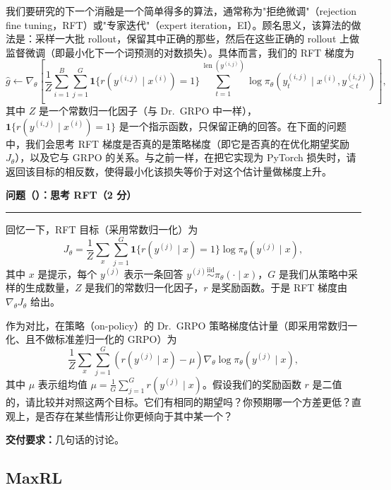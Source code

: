 我们要研究的下一个消融是一个简单得多的算法，通常称为"拒绝微调"（rejection fine tuning，RFT）或"专家迭代"（expert iteration，EI）。顾名思义，该算法的做法是：采样一大批 rollout，保留其中正确的那些，然后在这些正确的 rollout 上做监督微调（即最小化下一个词预测的对数损失）。具体而言，我们的 RFT 梯度为
\begin{equation}
\hat{g} \leftarrow \nabla_\theta\!\left[\frac{1}{Z}\sum_{i=1}^{B}\sum_{j=1}^{G}
\mathbf{1}\{r\!\left(y^{(i,j)} \mid x^{(i)}\right) = 1\}
\sum_{t=1}^{\operatorname{len}\!\left(y^{(i,j)}\right)}
\log \pi_\theta\!\left(y_t^{(i,j)} \mid x^{(i)}, y^{(i,j)}_{<t}\right)\right],
\end{equation}
其中 $Z$ 是一个常数归一化因子（与 Dr.\ GRPO 中一样），$\mathbf{1}\{r(y^{(i,j)} \mid x^{(i)}) = 1\}$ 是一个指示函数，只保留正确的回答。在下面的问题中，我们会思考 RFT 梯度是否真的是策略梯度（即它是否真的在优化期望奖励 $J_\theta$），以及它与 GRPO 的关系。与之前一样，在把它实现为 PyTorch 损失时，请返回该目标的相反数，使得最小化该损失等价于对这个估计量做梯度上升。

\medskip
\noindent\textbf{问题（）：思考 RFT（2 分）}
\par\nobreak\smallskip\hrule\nobreak\medskip

回忆一下，RFT 目标（采用常数归一化）为
\begin{equation}
J_\theta = \frac{1}{Z}\sum_{x}\sum_{j=1}^{G}\mathbf{1}\{r(y^{(j)} \mid x) = 1\}\log \pi_\theta\!\left(y^{(j)} \mid x\right),
\end{equation}
其中 $x$ 是提示，每个 $y^{(j)}$ 表示一条回答 $y^{(j)} \overset{\text{iid}}{\sim} \pi_\theta(\cdot \mid x)$，$G$ 是我们从策略中采样的生成数量，$Z$ 是我们的常数归一化因子，$r$ 是奖励函数。于是 RFT 梯度由 $\nabla_\theta J_\theta$ 给出。

作为对比，在策略（on-policy）的 Dr.\ GRPO 策略梯度估计量（即采用常数归一化、且不做标准差归一化的 GRPO）为
\begin{equation}
\frac{1}{Z}\sum_{x}\sum_{j=1}^{G}\left(r(y^{(j)} \mid x) - \mu\right)\nabla_\theta \log \pi_\theta\!\left(y^{(j)} \mid x\right),
\end{equation}
其中 $\mu$ 表示组均值 $\mu = \frac{1}{G}\sum_{j=1}^{G} r(y^{(j)} \mid x)$。假设我们的奖励函数 $r$ 是二值的，请比较并对照这两个目标。它们有相同的期望吗？你预期哪一个方差更低？直观上，是否存在某些情形让你更倾向于其中某一个？

\textbf{交付要求：}几句话的讨论。

\subsection{MaxRL}

